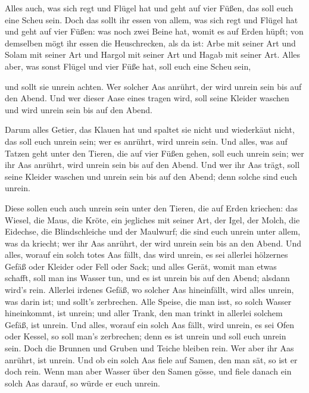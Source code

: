  Alles auch, was sich regt und Flügel hat und geht auf
vier Füßen, das soll euch eine Scheu sein.  Doch das
sollt ihr essen von allem, was sich regt und Flügel hat und geht auf
vier Füßen: was noch zwei Beine hat, womit es auf Erden hüpft;
 von demselben mögt ihr essen die Heuschrecken, als da
ist: Arbe mit seiner Art und Solam mit seiner Art und Hargol mit seiner
Art und Hagab mit seiner Art.  Alles aber, was sonst
Flügel und vier Füße hat, soll euch eine Scheu sein,

 und sollt sie unrein achten. Wer solcher Aas anrührt,
der wird unrein sein bis auf den Abend.  Und wer dieser
Aase eines tragen wird, soll seine Kleider waschen und wird unrein sein
bis auf den Abend.

 Darum alles Getier, das Klauen hat und spaltet sie nicht
und wiederkäut nicht, das soll euch unrein sein; wer es anrührt, wird
unrein sein.  Und alles, was auf Tatzen geht unter den
Tieren, die auf vier Füßen gehen, soll euch unrein sein; wer ihr Aas
anrührt, wird unrein sein bis auf den Abend.  Und wer ihr
Aas trägt, soll seine Kleider waschen und unrein sein bis auf den Abend;
denn solche sind euch unrein.

 Diese sollen euch auch unrein sein unter den Tieren, die
auf Erden kriechen: das Wiesel, die Maus, die Kröte, ein jegliches mit
seiner Art,  der Igel, der Molch, die Eidechse, die
Blindschleiche und der Maulwurf;  die sind euch unrein
unter allem, was da kriecht; wer ihr Aas anrührt, der wird unrein sein
bis an den Abend.  Und alles, worauf ein solch totes Aas
fällt, das wird unrein, es sei allerlei hölzernes Gefäß oder Kleider
oder Fell oder Sack; und alles Gerät, womit man etwas schafft, soll man
ins Wasser tun, und es ist unrein bis auf den Abend; alsdann wird's
rein.  Allerlei irdenes Gefäß, wo solcher Aas
hineinfällt, wird alles unrein, was darin ist; und sollt's zerbrechen.
 Alle Speise, die man isst, so solch Wasser hineinkommt,
ist unrein; und aller Trank, den man trinkt in allerlei solchem Gefäß,
ist unrein.  Und alles, worauf ein solch Aas fällt, wird
unrein, es sei Ofen oder Kessel, so soll man's zerbrechen; denn es ist
unrein und soll euch unrein sein.  Doch die Brunnen und
Gruben und Teiche bleiben rein. Wer aber ihr Aas anrührt, ist unrein.
 Und ob ein solch Aas fiele auf Samen, den man sät, so
ist er doch rein.  Wenn man aber Wasser über den Samen
gösse, und fiele danach ein solch Aas darauf, so würde er euch unrein.

